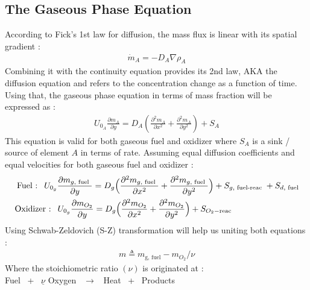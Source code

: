 \documentclass[12pt]{article}
\numberwithin{equation}{section}
\begin{document}
\begin{flushleft}
\newpage

\subsection{The Gaseous Phase Equation}

According to Fick's 1st law for diffusion, the mass flux is linear with its spatial gradient :
\begin{align} 
\dot{m}_{A}=-D_{A} \nabla \rho_{A}
\end{align}
Combining it with the continuity equation provides its 2nd law, AKA the diffusion equation and refers to the concentration change as a function of time. Using that, the gaseous phase
equation in terms of mass fraction will be expressed as :
\begin{align} 
U_{0_{A}} \frac{\partial m_{A}}{\partial y}=D_{A}\left(\frac{\partial^{2} m_{A}}{\partial x^{2}}+\frac{\partial^{2} m_{A}}{\partial y^{2}}\right)+S_{A}
\end{align}
This equation is valid for both gaseous fuel and oxidizer where $S_{A}$ is a sink / source of element $A$ in terms of rate. Assuming equal diffusion coefficients and equal velocities for both gaseous fuel and oxidizer :
\begin{align} 
\text { Fuel : } \ U_{0_{g}} \frac{\partial m_{g, \text { fuel }}}{\partial y}=D_{g} \Big( \frac{\partial^{2} m_{g, \text { fuel }}}{\partial x^{2}}+\frac{\partial^{2} m_{g, \text { \text{fuel} }}}{\partial y^{2}} \Big)+S_{g, \text { fuel-reac }}+S_{d, \text { fuel }} \label{3_fuel} \\
\text { Oxidizer : } \ U_{0_{g}} \frac{\partial m_{O_{2}}}{\partial y}=D_{g} \Big( \frac{\partial^{2} m_{O_{2}}}{\partial x^{2}}+\frac{\partial^{2} m_{O_{2}}}{\partial y^{2}} \Big)+S_{O_{2}-\text{reac}} \hspace{29mm} \label{3_oxidizer}
\end{align}
Using Schwab-Zeldovich (S-Z) transformation will help us uniting both equations :
\begin{align} 
m \triangleq m_{\text{g, fuel}}-m_{O_{2}} / \nu
\end{align}
Where the stoichiometric ratio $(\nu)$ is originated at : \\ \vspace{3mm}
\hspace{45mm} Fuel \ + \ $\underline{\nu}$ Oxygen \ $\rightarrow$ \ Heat \ + \ Products 


\end{flushleft}
\end{document}
